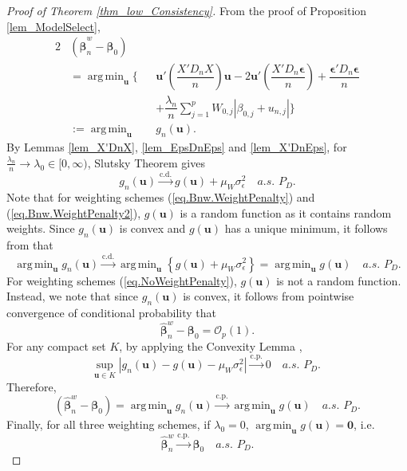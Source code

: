 \documentclass[ejs,authoryear,linksfromyear]{imsart}
\DeclareMathOperator*{\argmin}{arg\,min} %
\newcommand{\CONV}[1]{\stackrel{\text{#1}}{\longrightarrow}} %
\newcommand{\bnw}{\widehat{\bm{\beta}}_n^w} %
\numberwithin{equation}{section}
\theoremstyle{plain}
\begin{document}
\begin{proof}[Proof of Theorem \ref{thm_low_Consistency}]
	From the proof of Proposition \ref{lem_ModelSelect}, 
	\begin{alignat*}{2}
	&(\bnw - \bm{\beta}_0) &&\\
	&= \argmin_{\bm{u}}
	\Bigg\{
	&&\bm{u}' \left( \dfrac{X' D_n X}{n} \right) \bm{u}
	-2 \bm{u}' \left( \dfrac{X' D_n \bm{\epsilon}}{n} \right) 
	+ \dfrac{\bm{\epsilon}' D_n \bm{\epsilon}}{n} \\
	& &&+ \dfrac{\lambda_n}{n} 
	\sum_{j=1}^{p} W_{0,j} | \beta_{0,j} + u_{n,j} |
	\Bigg\} \\
	&:= \argmin_{\bm{u}} &&g_n(\bm{u}). 
	\end{alignat*}
	By Lemmas \ref{lem_X'DnX}, \ref{lem_EpsDnEps} and \ref{lem_X'DnEps}, for $\frac{\lambda_n}{n} \to \lambda_0 \in [0,\infty)$, Slutsky Theorem gives
	$$
	g_n(\bm{u}) \CONV{c.d.} g(\bm{u}) + \mu_W \sigma^2_{\epsilon}
	\quad a.s. \,\, P_D.
	$$
	Note that for weighting schemes (\ref{eq.Bnw.WeightPenalty}) and (\ref{eq.Bnw.WeightPenalty2}), $g(\bm{u})$ is a random function as it contains random weights. Since $g_n(\bm{u})$ is convex and $g(\bm{u})$ has a unique minimum, it follows from \citet{Geyer1996} that 
	$$
	\argmin_{ \bm{u} } g_n( \bm{u} )
	\CONV{c.d.}
	\argmin_{ \bm{u} } \left\{
		g( \bm{u} ) + \mu_W \sigma^2_{\epsilon}
	\right\} 
	= \argmin_{ \bm{u} } g( \bm{u} ) 
	\quad a.s. \,\, P_D.
	$$ 
	For weighting schemes (\ref{eq.NoWeightPenalty}), $g(\bm{u})$ is not a random function. Instead, we note that since $g_n(\bm{u})$ is convex, it follows from pointwise convergence of conditional probability that  
	$$
	\bnw - \bm{\beta}_0 = \mathcal{O}_p(1). 
	$$
	For any compact set $K$, by applying the Convexity Lemma \citep{Pollard1991},
	$$
	\underset{\bm{u} \in K}{\text{sup}} \; 
	\left\vert g_n (\bm{u}) - g (\bm{u}) - \mu_W \sigma^2_{\epsilon} \right\vert
	\CONV{c.p.} 0 \quad a.s. \,\, P_D. 	
	$$
	Therefore,
	$$
	\left( \bnw - \bm{\beta}_0 \right)   
	= 	\argmin_{\bm{u}} g_n(\bm{u})
	\CONV{c.p.} \argmin_{\bm{u}} g(\bm{u})  \quad a.s. \,\, P_D.
	$$ 
	Finally, for all three weighting schemes, if $\lambda_0 = 0$, $\argmin_{\bm{u}} g(\bm{u}) = \bm{0}$, i.e. 
	$$
	\bnw \CONV{c.p.} \bm{\beta}_0  \quad a.s. \,\, P_D.
	$$ 
\end{proof}
\end{document}
